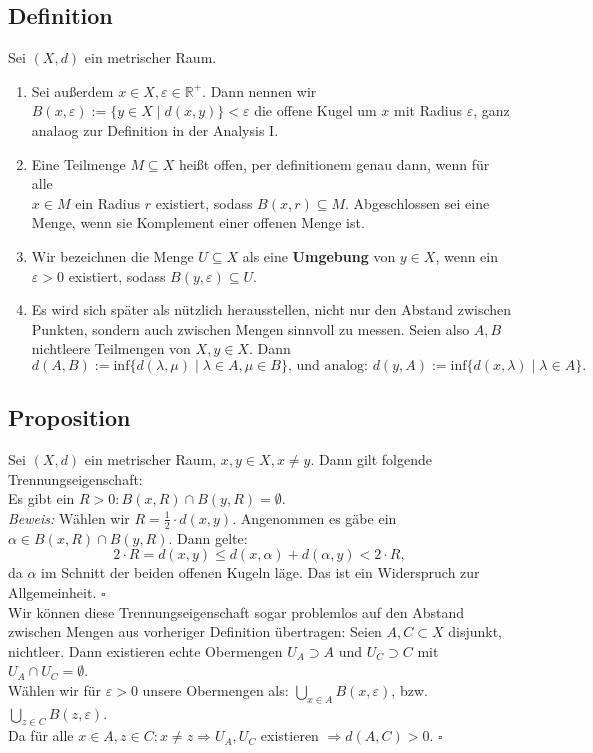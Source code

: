 \documentclass[11pt,leqno]{article}
\begin{document}
\subsection{Definition}
Sei $(X,d)$ ein metrischer Raum.
\begin{enumerate}
    \item Sei außerdem $x \in X, \varepsilon \in \mathbb{R}^+$. Dann nennen wir $B(x,\varepsilon):=\{y \in X \mid d(x,y) \} < \varepsilon$ die offene 
    Kugel um $x$ mit Radius $\varepsilon$, ganz analaog zur Definition in der Analysis I. 
    \item Eine Teilmenge $M \subseteq X$ heißt offen, per definitionem genau dann, wenn für alle \\ $x \in M$ ein Radius $r$ existiert, 
    sodass $B(x,r) \subseteq M$. Abgeschlossen sei eine Menge, wenn sie Komplement einer offenen Menge ist.
    \item Wir bezeichnen die Menge $U \subseteq X$ als eine \textbf{Umgebung} von $y \in X$, wenn ein $\varepsilon > 0$ existiert, 
    sodass $B(y,\varepsilon) \subseteq U$.
    \item Es wird sich später als nützlich herausstellen, nicht nur den Abstand zwischen Punkten, sondern auch zwischen Mengen sinnvoll zu messen. 
    Seien also $A,B$ nichtleere Teilmengen von $X, y \in X$. 
    Dann \[d(A,B):= \text{inf}\{d(\lambda, \mu) \mid \lambda \in A, \mu \in B \}\text{, und analog: }d(y,A):= 
    \text{inf}\{d(x, \lambda) \mid \lambda \in A \}.\]
\end{enumerate}

\subsection{Proposition}
Sei $(X,d)$ ein metrischer Raum, $x,y \in X, x \neq y$. Dann gilt folgende Trennungseigenschaft: \\
Es gibt ein $R > 0: B(x,R) \cap B(y,R) = \emptyset$. \\
\textit{Beweis:} Wählen wir $R= \frac{1}{2} \cdot d(x,y)$. Angenommen es gäbe ein $\alpha \in B(x,R) \cap B(y,R)$. Dann gelte: 
\[2 \cdot R = d(x,y) \leq d(x,\alpha) + d(\alpha,y) < 2 \cdot R, \]
da $\alpha$ im Schnitt der beiden offenen Kugeln läge. Das ist ein Widerspruch zur Allgemeinheit. $\square$\\
Wir können diese Trennungseigenschaft sogar problemlos auf den Abstand zwischen Mengen aus vorheriger Definition übertragen: 
Seien $A,C \subset X$ disjunkt, nichtleer. Dann existieren echte Obermengen $U_A \supset A$ und $U_C \supset C$ mit $U_A \cap U_C = \emptyset$. \\
Wählen wir für $\varepsilon > 0$ unsere Obermengen als: $\bigcup_{x \in A}B(x,\varepsilon) $, bzw. $\bigcup_{z \in C}B(z,\varepsilon) $.\\ 
Da für alle $x\in A, z \in C: x \neq z \Rightarrow U_A, U_C$ existieren $\Rightarrow d(A,C) > 0$. $\square$
\end{document}
